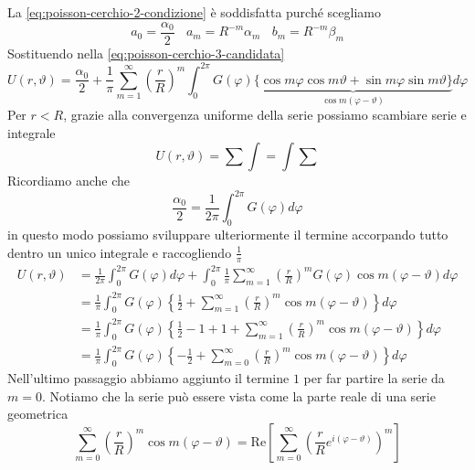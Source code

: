 \documentclass[10pt,a4paper,twoside,openright]{book}
\begin{document}
\begin{dimostrazione}
La \eqref{eq:poisson-cerchio-2-condizione} è soddisfatta purché scegliamo
\begin{equation*}
a_{0} =\frac{\alpha _{0}}{2} \ \ \ \ a_{m} =R^{-m} \alpha _{m} \ \ \ \ b_{m} =R^{-m} \beta _{m}
\end{equation*}
Sostituendo nella \eqref{eq:poisson-cerchio-3-candidata}
\begin{equation*}
U(r,\vartheta) =\frac{\alpha _{0}}{2} +\frac{1}{\pi }\sum\limits ^{\infty }_{m=1}\left(\frac{r}{R}\right)^{m}\int ^{2\pi }_{0} G(\varphi)\underbrace{\{\cos m\varphi \cos m\vartheta +\sin m\varphi \sin m\vartheta \}}_{\cos m( \varphi -\vartheta)} d\varphi 
\end{equation*}
Per $r< R$, grazie alla convergenza uniforme della serie possiamo scambiare serie e integrale
\begin{equation*}
U(r,\vartheta) =\sum \int =\int \sum 
\end{equation*}
Ricordiamo anche che
\begin{equation*}
\frac{\alpha _{0}}{2} =\frac{1}{2\pi }\int ^{2\pi }_{0} G(\varphi) d\varphi 
\end{equation*}
in questo modo possiamo sviluppare ulteriormente il termine accorpando tutto dentro un unico integrale e raccogliendo $\frac{1}{\pi }$
\begin{align}
U(r,\vartheta) & =\frac{1}{2\pi }\int ^{2\pi }_{0} G(\varphi) d\varphi +\int ^{2\pi }_{0}\frac{1}{\pi }\sum\limits ^{\infty }_{m=1}\left(\frac{r}{R}\right)^{m} G(\varphi)\cos m( \varphi -\vartheta) d\varphi \nonumber\\
 & =\frac{1}{\pi }\int ^{2\pi }_{0} G(\varphi)\left\{\frac{1}{2} +\sum\limits ^{\infty }_{m=1}\left(\frac{r}{R}\right)^{m}\cos m( \varphi -\vartheta)\right\} d\varphi \nonumber\\
 & =\frac{1}{\pi }\int ^{2\pi }_{0} G(\varphi)\left\{\frac{1}{2} -1+1+\sum\limits ^{\infty }_{m=1}\left(\frac{r}{R}\right)^{m}\cos m( \varphi -\vartheta)\right\} d\varphi \nonumber\\
 & =\frac{1}{\pi }\int ^{2\pi }_{0} G(\varphi)\left\{-\frac{1}{2} +\sum\limits ^{\infty }_{m=0}\left(\frac{r}{R}\right)^{m}\cos m( \varphi -\vartheta)\right\} d\varphi \label{eq:poisson-cerchio-1}
\end{align}
Nell'ultimo passaggio abbiamo aggiunto il termine $1$ per far partire la serie da $m=0$. Notiamo che la serie può essere vista come la parte reale di una serie geometrica
\begin{equation*}
\sum\limits ^{\infty }_{m=0}\left(\frac{r}{R}\right)^{m}\cos m( \varphi -\vartheta) =\mathrm{Re}\left[\sum\limits ^{\infty }_{m=0}\left(\frac{r}{R} e^{i( \varphi -\vartheta)}\right)^{m}\right]

\end{equation*}
\end{dimostrazione}
\end{document}
